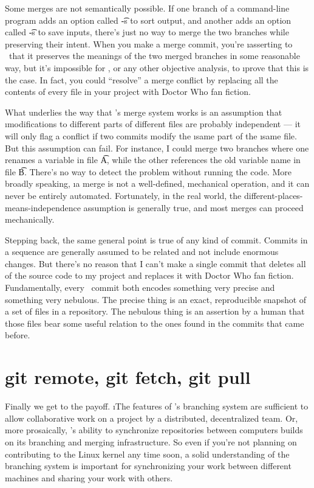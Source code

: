 \documentclass[letterpaper, 12pt, titlepage, twoside]{article}
\begin{document}
Some merges are not semantically possible. If one branch of a command-line
program adds an option called \t{-s} to sort output, and another adds an
option called \t{-s} to save inputs, there's just no way to merge the two
branches while preserving their intent. When you make a merge commit, you're
\i{asserting} to \git\ that it preserves the meanings of the two merged
branches in some reasonable way, but it's impossible for \git, or any other
objective analysis, to \i{prove} that this is the case. In fact, you could
``resolve'' a merge conflict by replacing all the contents of every file in
your project with Doctor Who fan fiction.

What underlies the way that \git's merge system works is an assumption that
\i{modifications to different parts of different files are probably
  independent} --- it will only flag a conflict if two commits modify the
\i{same} part of the \i{same} file. But this assumption can fail. For
instance, I could merge two branches where one renames a variable in file
\t{A}, while the other references the old variable name in file \t{B}. There's
no way to detect the problem without running the code. More broadly speaking,
\i{a merge is not a well-defined, mechanical operation, and it can never be
  entirely automated}. Fortunately, in the real world, the
different-places-means-independence assumption is generally true, and most
merges can proceed mechanically.

Stepping back, the same general point is true of any kind of commit. Commits
in a sequence are generally assumed to be related and not include enormous
changes. But there's no reason that I can't make a single commit that deletes
all of the source code to my project and replaces it with Doctor Who fan
fiction. Fundamentally, every \git\ commit both encodes something very precise
and something very nebulous. The precise thing is an exact, reproducible
snapshot of a set of files in a repository. The nebulous thing is an assertion
by a human that those files bear some useful relation to the ones found in the
commits that came before.


\section{git remote, git fetch, git pull}

Finally we get to the payoff. \i{The features of \git's branching system are
  sufficient to allow collaborative work on a project by a distributed,
  decentralized team.} Or, more prosaically, \git's ability to synchronize
repositories between computers builds on its branching and merging
infrastructure. So even if you're not planning on contributing to the Linux
kernel any time soon, a solid understanding of the branching system is
important for synchronizing your work between different machines and sharing
your work with others.
\end{document}
